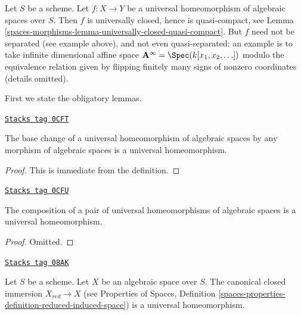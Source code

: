 Let $S$ be a scheme.
Let $f : X \to Y$ be a universal homeomorphism of algebraic spaces
over $S$. Then $f$ is universally closed, hence is quasi-compact, see
Lemma \ref{spaces-morphisms-lemma-universally-closed-quasi-compact}.
But $f$ need not be separated (see example above), and not even
quasi-separated: an example is to take infinite dimensional affine
space $\mathbf{A}^\infty = \Spec(k[x_1, x_2, \ldots])$ modulo
the equivalence relation given by flipping finitely many signs of
nonzero coordinates (details omitted).

\medskip\noindent
First we state the obligatory lemmas.

\begin{lemma}
\label{spaces-morphisms-lemma-base-change-universal-homeomorphism}
\href{https://stacks.math.columbia.edu/tag/0CFT}{\texttt{Stacks tag 0CFT}}

The base change of a universal homeomorphism of algebraic spaces
by any morphism of algebraic spaces is a universal homeomorphism.
\end{lemma}

\begin{proof}
This is immediate from the definition.
\end{proof}

\begin{lemma}
\label{spaces-morphisms-lemma-composition-universal-homeomorphism}
\href{https://stacks.math.columbia.edu/tag/0CFU}{\texttt{Stacks tag 0CFU}}

The composition of a pair of universal homeomorphisms of
algebraic spaces is a universal homeomorphism.
\end{lemma}

\begin{proof}
Omitted.
\end{proof}

\begin{lemma}
\label{spaces-morphisms-lemma-reduction-universal-homeomorphism}
\href{https://stacks.math.columbia.edu/tag/08AK}{\texttt{Stacks tag 08AK}}

Let $S$ be a scheme. Let $X$ be an algebraic space over $S$.
The canonical closed immersion $X_{red} \to X$ (see
Properties of Spaces, Definition
\ref{spaces-properties-definition-reduced-induced-space})
is a universal homeomorphism.
\end{lemma}

